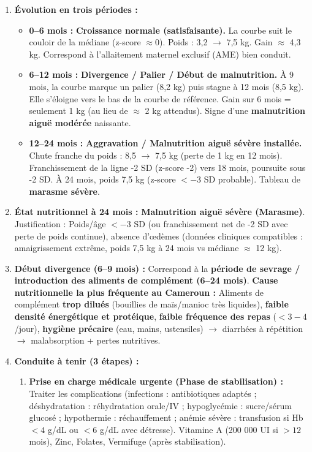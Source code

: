 \documentclass[11pt]{article}
\begin{document}
\begin{corrige}
\begin{enumerate}
    \item \textbf{Évolution en trois périodes :}
    \begin{itemize}
        \item \textbf{0–6 mois :} \textbf{Croissance normale (satisfaisante).} La courbe suit le couloir de la médiane (z-score $\approx 0$). Poids : 3,2 $\rightarrow$ 7,5 kg. Gain $\approx$ 4,3 kg. Correspond à l'allaitement maternel exclusif (AME) bien conduit.
        \item \textbf{6–12 mois :} \textbf{Divergence / Palier / Début de malnutrition.} À 9 mois, la courbe marque un palier (8,2 kg) puis stagne à 12 mois (8,5 kg). Elle s'éloigne vers le bas de la courbe de référence. Gain sur 6 mois = seulement 1 kg (au lieu de $\approx$ 2 kg attendus). Signe d'une \textbf{malnutrition aiguë modérée} naissante.
        \item \textbf{12–24 mois :} \textbf{Aggravation / Malnutrition aiguë sévère installée.} Chute franche du poids : 8,5 $\rightarrow$ 7,5 kg (perte de 1 kg en 12 mois). Franchissement de la ligne -2 SD (z-score -2) vers 18 mois, poursuite sous -2 SD. À 24 mois, poids 7,5 kg (z-score $< -3$ SD probable). Tableau de \textbf{marasme sévère}.
    \end{itemize}
    \item \textbf{État nutritionnel à 24 mois :} \textbf{Malnutrition aiguë sévère (Marasme)}. Justification : Poids/âge $< -3$ SD (ou franchissement net de -2 SD avec perte de poids continue), absence d'œdèmes (données cliniques compatibles : amaigrissement extrême, poids 7,5 kg à 24 mois vs médiane $\approx$ 12 kg).
    \item \textbf{Début divergence (6–9 mois) :} Correspond à la \textbf{période de sevrage / introduction des aliments de complément (6–24 mois)}. \textbf{Cause nutritionnelle la plus fréquente au Cameroun :} Aliments de complément \textbf{trop dilués} (bouillies de maïs/manioc très liquides), \textbf{faible densité énergétique et protéique}, \textbf{faible fréquence des repas} ($< 3-4$/jour), \textbf{hygiène précaire} (eau, mains, ustensiles) $\rightarrow$ diarrhées à répétition $\rightarrow$ malabsorption + pertes nutritives.
    \item \textbf{Conduite à tenir (3 étapes) :}
    \begin{enumerate}
        \item \textbf{Prise en charge médicale urgente (Phase de stabilisation) :} Traiter les complications (infections : antibiotiques adaptés ; déshydratation : réhydratation orale/IV ; hypoglycémie : sucre/sérum glucosé ; hypothermie : réchauffement ; anémie sévère : transfusion si Hb $< 4$ g/dL ou $< 6$ g/dL avec détresse). Vitamine A (200 000 UI si $> 12$ mois), Zinc, Folates, Vermifuge (après stabilisation).

\end{enumerate}
\end{enumerate}
\end{corrige}
\end{document}
